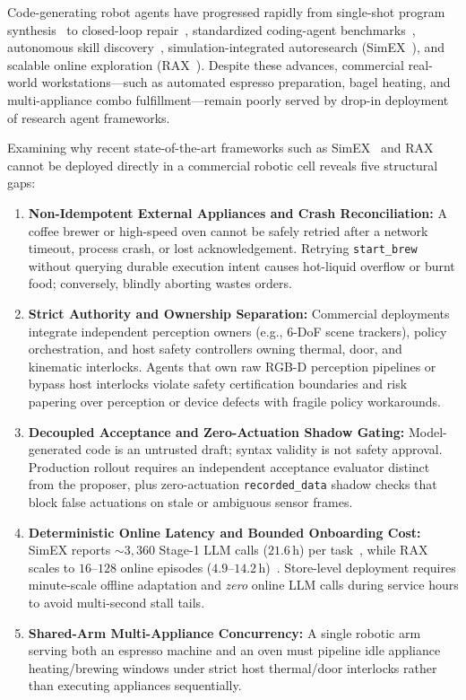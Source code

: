 \documentclass{trax}
\begin{document}
Code-generating robot agents have progressed rapidly from single-shot program synthesis~\cite{liang2022cap,singh2022progprompt} to closed-loop repair~\cite{schlesinger2024roborepair,ahn2025reliablecap}, standardized coding-agent benchmarks~\cite{fu2026capx}, autonomous skill discovery~\cite{lu2026aspire,enpire2026,ace2026}, simulation-integrated autoresearch (SimEX~\cite{hu2026simex}), and scalable online exploration (RAX~\cite{huang2026rax}). Despite these advances, commercial real-world workstations---such as automated espresso preparation, bagel heating, and multi-appliance combo fulfillment---remain poorly served by drop-in deployment of research agent frameworks.

Examining why recent state-of-the-art frameworks such as SimEX~\cite{hu2026simex} and RAX~\cite{huang2026rax} cannot be deployed directly in a commercial robotic cell reveals five structural gaps:
\begin{enumerate}
    \item \textbf{Non-Idempotent External Appliances and Crash Reconciliation:} A coffee brewer or high-speed oven cannot be safely retried after a network timeout, process crash, or lost acknowledgement. Retrying \texttt{start\_brew} without querying durable execution intent causes hot-liquid overflow or burnt food; conversely, blindly aborting wastes orders.
    \item \textbf{Strict Authority and Ownership Separation:} Commercial deployments integrate independent perception owners (e.g., 6-DoF scene trackers), policy orchestration, and host safety controllers owning thermal, door, and kinematic interlocks. Agents that own raw RGB-D perception pipelines or bypass host interlocks violate safety certification boundaries and risk papering over perception or device defects with fragile policy workarounds.
    \item \textbf{Decoupled Acceptance and Zero-Actuation Shadow Gating:} Model-generated code is an untrusted draft; syntax validity is not safety approval. Production rollout requires an independent acceptance evaluator distinct from the proposer, plus zero-actuation \texttt{recorded\_data} shadow checks that block false actuations on stale or ambiguous sensor frames.
    \item \textbf{Deterministic Online Latency and Bounded Onboarding Cost:} SimEX reports $\sim 3{,}360$ Stage-1 LLM calls ($21.6\,\mathrm{h}$) per task~\cite{hu2026simex}, while RAX scales to $16$--$128$ online episodes ($4.9$--$14.2\,\mathrm{h}$)~\cite{huang2026rax}. Store-level deployment requires minute-scale offline adaptation and \emph{zero} online LLM calls during service hours to avoid multi-second stall tails.
    \item \textbf{Shared-Arm Multi-Appliance Concurrency:} A single robotic arm serving both an espresso machine and an oven must pipeline idle appliance heating/brewing windows under strict host thermal/door interlocks rather than executing appliances sequentially.
\end{enumerate}
\end{document}
